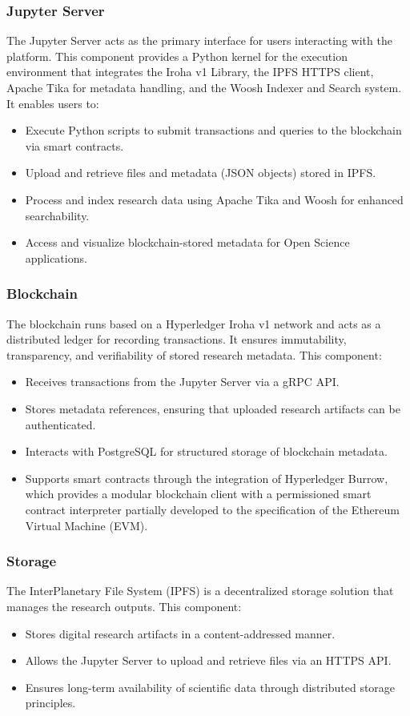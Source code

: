 \documentclass{article}
\begin{document}
\subsubsection{Jupyter Server}
The Jupyter Server acts as the primary interface for users interacting with the platform. This component provides a Python kernel for the execution environment that integrates the Iroha v1 Library, the IPFS HTTPS client, Apache Tika for metadata handling, and the Woosh Indexer and Search system. It enables users to:

\begin{itemize}
    \item Execute Python scripts to submit transactions and queries to the blockchain via smart contracts.
    \item Upload and retrieve files and metadata (JSON objects) stored in IPFS.
    \item Process and index research data using Apache Tika and Woosh for enhanced searchability.
    \item Access and visualize blockchain-stored metadata for Open Science applications.
\end{itemize}

\subsubsection{Blockchain}
The blockchain runs based on a Hyperledger Iroha v1 network and acts as a distributed ledger for recording transactions. It ensures immutability, transparency, and verifiability of stored research metadata. This component:
\begin{itemize}
    \item Receives transactions from the Jupyter Server via a gRPC API.
    \item Stores metadata references, ensuring that uploaded research artifacts can be authenticated.
    \item Interacts with PostgreSQL for structured storage of blockchain metadata.
    \item Supports smart contracts through the integration of Hyperledger Burrow, which provides a modular blockchain client with a permissioned smart contract interpreter partially developed to the specification of the Ethereum Virtual Machine (EVM).

\end{itemize}

\subsubsection{Storage}
The InterPlanetary File System (IPFS) is a decentralized storage solution that manages the research outputs. This component:
\begin{itemize}
    \item Stores digital research artifacts in a content-addressed manner.
    \item Allows the Jupyter Server to upload and retrieve files via an HTTPS API.
    \item Ensures long-term availability of scientific data through distributed storage principles.
\end{itemize}
\end{document}
